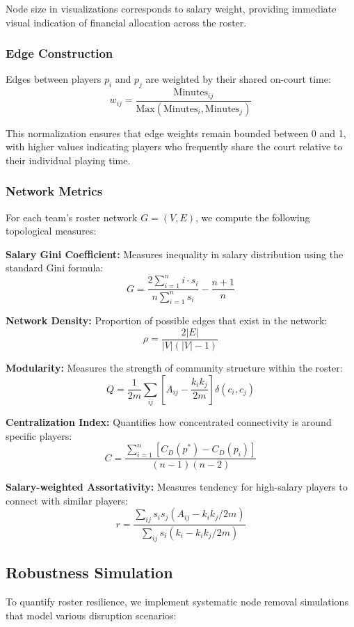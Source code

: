 \documentclass[11pt]{article}
\begin{document}
Node size in visualizations corresponds to salary weight, providing immediate visual indication of financial allocation across the roster.

\subsubsection{Edge Construction}

Edges between players $p_i$ and $p_j$ are weighted by their shared on-court time:
$$w_{ij} = \frac{\text{Minutes}_{ij}}{\text{Max}(\text{Minutes}_{i}, \text{Minutes}_{j})}$$

This normalization ensures that edge weights remain bounded between 0 and 1, with higher values indicating players who frequently share the court relative to their individual playing time.

\subsubsection{Network Metrics}

For each team's roster network $G = (V, E)$, we compute the following topological measures:

\textbf{Salary Gini Coefficient:} Measures inequality in salary distribution using the standard Gini formula:
$$G = \frac{2\sum_{i=1}^{n} i \cdot s_i}{n \sum_{i=1}^{n} s_i} - \frac{n+1}{n}$$

\textbf{Network Density:} Proportion of possible edges that exist in the network:
$$\rho = \frac{2|E|}{|V|(|V|-1)}$$

\textbf{Modularity:} Measures the strength of community structure within the roster:
$$Q = \frac{1}{2m} \sum_{ij} \left[ A_{ij} - \frac{k_i k_j}{2m} \right] \delta(c_i, c_j)$$

\textbf{Centralization Index:} Quantifies how concentrated connectivity is around specific players:
$$C = \frac{\sum_{i=1}^{n} [C_D(p^*) - C_D(p_i)]}{(n-1)(n-2)}$$

\textbf{Salary-weighted Assortativity:} Measures tendency for high-salary players to connect with similar players:
$$r = \frac{\sum_{ij} s_i s_j (A_{ij} - k_i k_j / 2m)}{\sum_{ij} s_i (k_i - k_i k_j / 2m)}$$

\subsection{Robustness Simulation}

To quantify roster resilience, we implement systematic node removal simulations that model various disruption scenarios:
\end{document}
